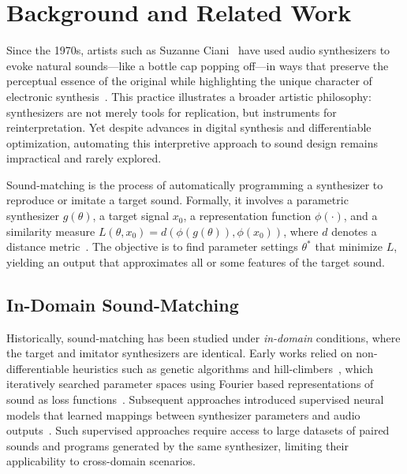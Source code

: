 \documentclass[runningheads]{llncs}
\begin{document}
\section{Background and Related Work}
\label{sec:background}
Since the 1970s, artists such as Suzanne Ciani~\cite{ciani_life_in_waves} have used audio synthesizers to evoke natural sounds—like a bottle cap popping off—in ways that preserve the perceptual essence of the original while highlighting the unique character of electronic synthesis~\cite{creativecherep2024}.
This practice illustrates a broader artistic philosophy: synthesizers are not merely tools for replication, but instruments for reinterpretation.
Yet despite advances in digital synthesis and differentiable optimization, automating this interpretive approach to sound design remains impractical and rarely explored.

Sound-matching is the process of automatically programming a synthesizer to reproduce or imitate a target sound.  
Formally, it involves a parametric synthesizer $g(\theta)$, a target signal $x_0$, a representation function $\phi(\cdot)$, and a similarity measure $L(\theta, x_0) = d(\phi(g(\theta)), \phi(x_0))$, where $d$ denotes a distance metric~\cite{vahidi2023mesostructures,han2023perceptual,salimi2025evaluating}. The objective is to find parameter settings $\theta^*$ that minimize $L$, yielding an output that approximates all or some features of the target sound.  

\subsection{In-Domain Sound-Matching}
Historically, sound-matching has been studied under \emph{in-domain} conditions, where the target and imitator synthesizers are identical.  
Early works relied on non-differentiable heuristics such as genetic algorithms and hill-climbers~\cite{horner1993machine,mitchell2007evolutionary}, which iteratively searched parameter spaces using Fourier based representations of sound as loss functions~\cite{smith2007mathematics}.  
Subsequent approaches introduced supervised neural models that learned mappings between synthesizer parameters and audio outputs~\cite{yee2018automatic,esling2019flow,masuda2021soundmatch}. Such supervised approaches require access to large datasets of paired sounds and programs generated by the same synthesizer, limiting their applicability to cross-domain scenarios.
\end{document}

